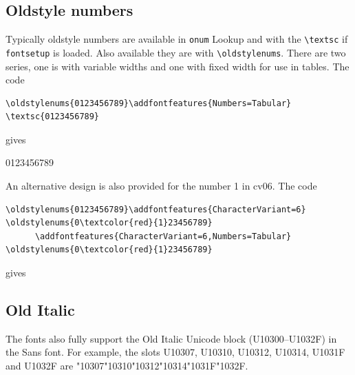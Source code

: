 \documentclass{article}
\begin{document}
\subsection{Oldstyle numbers}

Typically oldstyle numbers are available in \verb|onum| Lookup
and with the \verb|\textsc| if \verb|fontsetup| is loaded.
Also available they are with \verb|\oldstylenums|.
There are two series, one is with variable widths and one with
fixed width for use in tables. The code

\begin{verbatim}
\oldstylenums{0123456789}\addfontfeatures{Numbers=Tabular}
\textsc{0123456789}
\end{verbatim}
gives


\textsc{0123456789}

\medskip

\noindent An alternative design is also provided for the number 1 in cv06.
The code

\begin{verbatim}
\oldstylenums{0123456789}\addfontfeatures{CharacterVariant=6}
\oldstylenums{0\textcolor{red}{1}23456789}
      \addfontfeatures{CharacterVariant=6,Numbers=Tabular}
\oldstylenums{0\textcolor{red}{1}23456789}
\end{verbatim}
gives








\subsection{Old Italic}

The fonts also fully support the Old Italic Unicode block
(U10300--U1032F) in the Sans font. For example, the slots
U10307, U10310, U10312, U10314, U1031F and U1032F are
{\sffamily\char"10307\char"10310\char"10312\char"10314\char"1031F\char"1032F}.
\end{document}
